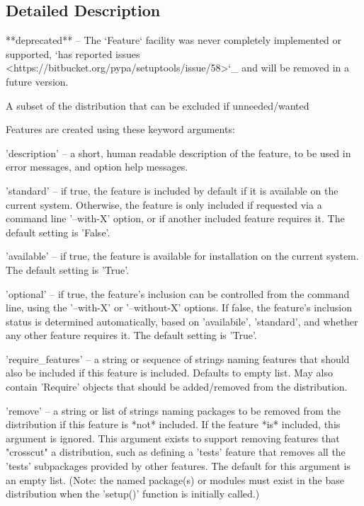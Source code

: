 \subsection{Detailed Description}
\begin{DoxyVerb}**deprecated** -- The `Feature` facility was never completely implemented
or supported, `has reported issues
<https://bitbucket.org/pypa/setuptools/issue/58>`_ and will be removed in
a future version.

A subset of the distribution that can be excluded if unneeded/wanted

Features are created using these keyword arguments:

  'description' -- a short, human readable description of the feature, to
     be used in error messages, and option help messages.

  'standard' -- if true, the feature is included by default if it is
     available on the current system.  Otherwise, the feature is only
     included if requested via a command line '--with-X' option, or if
     another included feature requires it.  The default setting is 'False'.

  'available' -- if true, the feature is available for installation on the
     current system.  The default setting is 'True'.

  'optional' -- if true, the feature's inclusion can be controlled from the
     command line, using the '--with-X' or '--without-X' options.  If
     false, the feature's inclusion status is determined automatically,
     based on 'availabile', 'standard', and whether any other feature
     requires it.  The default setting is 'True'.

  'require_features' -- a string or sequence of strings naming features
     that should also be included if this feature is included.  Defaults to
     empty list.  May also contain 'Require' objects that should be
     added/removed from the distribution.

  'remove' -- a string or list of strings naming packages to be removed
     from the distribution if this feature is *not* included.  If the
     feature *is* included, this argument is ignored.  This argument exists
     to support removing features that "crosscut" a distribution, such as
     defining a 'tests' feature that removes all the 'tests' subpackages
     provided by other features.  The default for this argument is an empty
     list.  (Note: the named package(s) or modules must exist in the base
     distribution when the 'setup()' function is initially called.)


\end{DoxyVerb}
